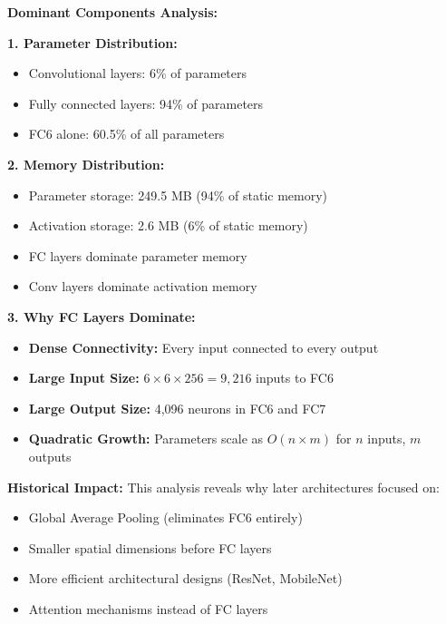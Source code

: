 \documentclass[12pt]{article}
\begin{document}
\begin{enumerate}[(a)]
{    \textbf{Dominant Components Analysis:}
    
    \textbf{1. Parameter Distribution:}
    \begin{itemize}
        \item Convolutional layers: 6\% of parameters
        \item Fully connected layers: 94\% of parameters
        \item FC6 alone: 60.5\% of all parameters
    \end{itemize}
    
    \textbf{2. Memory Distribution:}
    \begin{itemize}
        \item Parameter storage: 249.5 MB (94\% of static memory)
        \item Activation storage: 2.6 MB (6\% of static memory)
        \item FC layers dominate parameter memory
        \item Conv layers dominate activation memory
    \end{itemize}
    
    \textbf{3. Why FC Layers Dominate:}
    \begin{itemize}
        \item \textbf{Dense Connectivity:} Every input connected to every output
        \item \textbf{Large Input Size:} $6 \times 6 \times 256 = 9,216$ inputs to FC6
        \item \textbf{Large Output Size:} 4,096 neurons in FC6 and FC7
        \item \textbf{Quadratic Growth:} Parameters scale as $O(n \times m)$ for $n$ inputs, $m$ outputs
    \end{itemize}
    
    \textbf{Historical Impact:}
    This analysis reveals why later architectures focused on:
    \begin{itemize}
        \item Global Average Pooling (eliminates FC6 entirely)
        \item Smaller spatial dimensions before FC layers
        \item More efficient architectural designs (ResNet, MobileNet)
        \item Attention mechanisms instead of FC layers
    \end{itemize}
    }
    

\end{enumerate}
\end{document}
